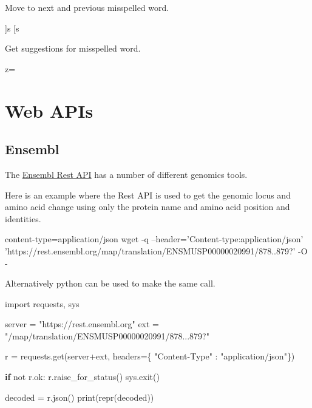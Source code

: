 \documentclass[]{book}
\newenvironment{Shaded}{\begin{snugshade}}{\end{snugshade}}
\newcommand{\ExtensionTok}[1]{#1}
\newcommand{\FunctionTok}[1]{\textcolor[rgb]{0.00,0.00,0.00}{#1}}
\newcommand{\KeywordTok}[1]{\textcolor[rgb]{0.13,0.29,0.53}{\textbf{#1}}}
\newcommand{\NormalTok}[1]{#1}
\newcommand{\StringTok}[1]{\textcolor[rgb]{0.31,0.60,0.02}{#1}}
\newcommand{\VariableTok}[1]{\textcolor[rgb]{0.00,0.00,0.00}{#1}}
\begin{document}
Move to next and previous misspelled word.

\begin{Shaded}
\begin{Highlighting}[]
\NormalTok{]}\ExtensionTok{s}
\NormalTok{[}\ExtensionTok{s}
\end{Highlighting}
\end{Shaded}

Get suggestions for misspelled word.

\begin{Shaded}
\begin{Highlighting}[]
\VariableTok{z=}
\end{Highlighting}
\end{Shaded}

\hypertarget{apis}{%
\chapter{Web APIs}\label{apis}}

\hypertarget{ensembl}{%
\section{Ensembl}\label{ensembl}}

The \href{https://rest.ensembl.org/}{Ensembl Rest API} has a number of different genomics tools.

Here is an example where the Rest API is used to get the genomic locus and amino acid change using only the protein name and amino acid position and identities.

\begin{Shaded}
\begin{Highlighting}[]
\ExtensionTok{content-type}\NormalTok{=application/json}
\FunctionTok{wget}\NormalTok{ -q --header=}\StringTok{'Content-type:application/json'} \StringTok{'https://rest.ensembl.org/map/translation/ENSMUSP00000020991/878..879?'}\NormalTok{  -O -}
\end{Highlighting}
\end{Shaded}

Alternatively python can be used to make the same call.

\begin{Shaded}
\begin{Highlighting}[]
\ExtensionTok{import}\NormalTok{ requests, sys}
 
\ExtensionTok{server}\NormalTok{ = }\StringTok{"https://rest.ensembl.org"}
\ExtensionTok{ext}\NormalTok{ = }\StringTok{"/map/translation/ENSMUSP00000020991/878...879?"}
 
\ExtensionTok{r}\NormalTok{ = requests.get(server+ext, headers=\{ }\StringTok{"Content-Type"}\NormalTok{ : }\StringTok{"application/json"}\NormalTok{\})}
 
\KeywordTok{if} \ExtensionTok{not}\NormalTok{ r.ok:}
  \ExtensionTok{r.raise_for_status}\NormalTok{()}
  \ExtensionTok{sys.exit}\NormalTok{()}
 
\ExtensionTok{decoded}\NormalTok{ = r.json()}
\ExtensionTok{print}\NormalTok{(repr(decoded))}
\end{Highlighting}
\end{Shaded}
\end{document}
